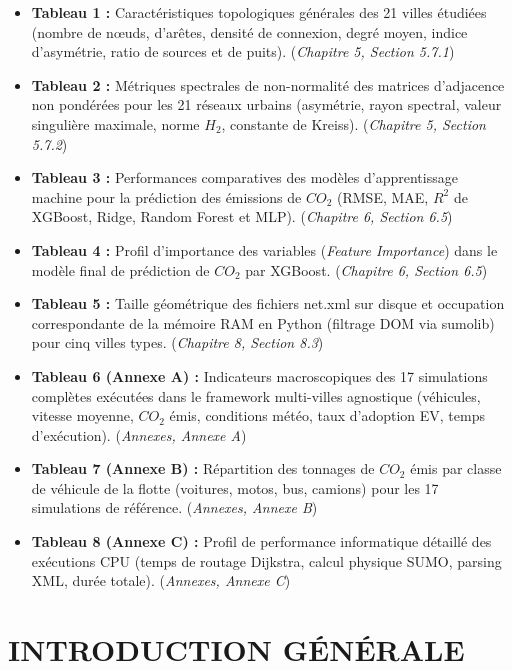 \documentclass[11pt, a4paper]{article}
\providecommand{\tightlist}{}
\begin{document}
\begin{itemize}
\tightlist
\item
  \textbf{Tableau 1 :} Caractéristiques topologiques générales des 21
  villes étudiées (nombre de nœuds, d'arêtes, densité de connexion,
  degré moyen, indice d'asymétrie, ratio de sources et de puits).
  (\emph{Chapitre 5, Section 5.7.1})
\item
  \textbf{Tableau 2 :} Métriques spectrales de non-normalité des
  matrices d'adjacence non pondérées pour les 21 réseaux urbains
  (asymétrie, rayon spectral, valeur singulière maximale, norme \(H_2\),
  constante de Kreiss). (\emph{Chapitre 5, Section 5.7.2})
\item
  \textbf{Tableau 3 :} Performances comparatives des modèles
  d'apprentissage machine pour la prédiction des émissions de \(CO_2\)
  (RMSE, MAE, \(R^2\) de XGBoost, Ridge, Random Forest et MLP).
  (\emph{Chapitre 6, Section 6.5})
\item
  \textbf{Tableau 4 :} Profil d'importance des variables (\emph{Feature
  Importance}) dans le modèle final de prédiction de \(CO_2\) par
  XGBoost. (\emph{Chapitre 6, Section 6.5})
\item
  \textbf{Tableau 5 :} Taille géométrique des fichiers net.xml sur
  disque et occupation correspondante de la mémoire RAM en Python
  (filtrage DOM via sumolib) pour cinq villes types. (\emph{Chapitre 8,
  Section 8.3})
\item
  \textbf{Tableau 6 (Annexe A) :} Indicateurs macroscopiques des 17
  simulations complètes exécutées dans le framework multi-villes
  agnostique (véhicules, vitesse moyenne, \(CO_2\) émis, conditions
  météo, taux d'adoption EV, temps d'exécution). (\emph{Annexes, Annexe
  A})
\item
  \textbf{Tableau 7 (Annexe B) :} Répartition des tonnages de \(CO_2\)
  émis par classe de véhicule de la flotte (voitures, motos, bus,
  camions) pour les 17 simulations de référence. (\emph{Annexes, Annexe
  B})
\item
  \textbf{Tableau 8 (Annexe C) :} Profil de performance informatique
  détaillé des exécutions CPU (temps de routage Dijkstra, calcul
  physique SUMO, parsing XML, durée totale). (\emph{Annexes, Annexe C})
\end{itemize}

\newpage

\section{INTRODUCTION GÉNÉRALE}\label{introduction-guxe9nuxe9rale}
\end{document}
